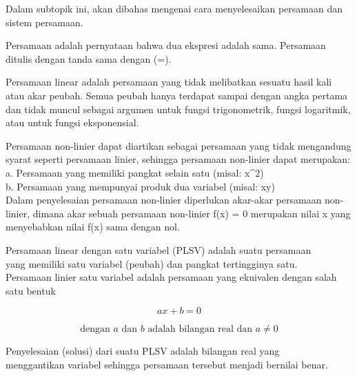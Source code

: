 
\begin{eulernotebook}


\begin{eulercomment}
Dalam subtopik ini, akan dibahas mengenai cara menyelesaikan persamaan
dan sistem persamaan.

\begin{eulercomment}
\begin{eulercomment}
Persamaan adalah pernyataan bahwa dua ekspresi adalah sama. Persamaan
ditulis dengan tanda sama dengan (=).

Persamaan linear adalah persamaan yang tidak melibatkan sesuatu hasil
kali atau akar peubah. Semua peubah hanya terdapat sampai dengan angka
pertama dan tidak muncul sebagai argumen untuk fungsi trigonometrik,
fungsi logaritmik, atau untuk fungsi eksponensial.

Persamaan non-linier dapat diartikan sebagai persamaan yang tidak
mengandung syarat seperti persamaan linier, sehingga persamaan
non-linier dapat merupakan:\\
a. Persamaan yang memiliki pangkat selain satu (misal: x\textasciicircum{}2)\\
b. Persamaan yang mempunyai produk dua variabel (misal: xy)\\
Dalam penyelesaian persamaan non-linier diperlukan akar-akar persamaan
non-linier, dimana akar sebuah persamaan non-linier f(x) = 0 merupakan
nilai x yang menyebabkan nilai f(x) sama dengan nol.

\end{eulercomment}
\begin{eulercomment}
Persamaan linear dengan satu variabel (PLSV) adalah suatu persamaan\\
yang memiliki satu variabel (peubah) dan pangkat tertingginya satu.\\
Persamaan linier satu variabel adalah persamaan yang ekuivalen dengan
salah satu bentuk

\end{eulercomment}
\begin{eulerformula}
\[
\boxed {ax+b=0}
\]
\end{eulerformula}
\begin{eulerformula}
\[
\text {dengan } a \text { dan } b \text { adalah bilangan real dan } a \neq 0
\]
\end{eulerformula}
\begin{eulercomment}
Penyelesaian (solusi) dari suatu PLSV adalah bilangan real yang\\
menggantikan variabel sehingga persamaan tersebut menjadi bernilai
benar.


\end{eulercomment}
\end{eulercomment}
\end{eulercomment}
\end{eulernotebook}
